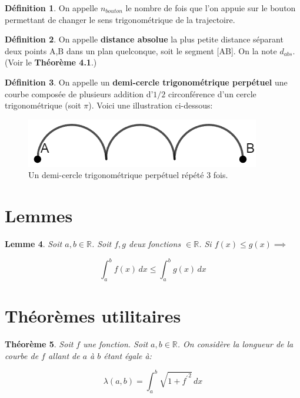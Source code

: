 \documentclass{amsart}
\newtheorem{theorem}{Théorème}[section]
\newtheorem{lemma}[theorem]{Lemme}
\theoremstyle{definition}
\newtheorem{definition}[theorem]{Définition}
\theoremstyle{remark}
\numberwithin{equation}{section}
\begin{document}
\begin{definition}
  On appelle $n_{bouton}$ le nombre de fois que l'on appuie sur le bouton permettant de changer le sens trigonométrique de la trajectoire.
\end{definition}

\begin{definition}
  On appelle \textbf{distance absolue} la plus petite distance séparant deux points A,B dans un plan quelconque, soit le segment [AB]. On la note $d_{abs}$. (Voir le \textbf{Théorème 4.1}.)
\end{definition}

\begin{definition}
  On appelle un \textbf{demi-cercle trigonométrique perpétuel} une courbe composée de plusieurs addition d'$1/2$ circonférence d'un cercle trigonométrique (soit $\pi$). Voici une illustration ci-dessous:

  \begin{figure}[!h]
    \centering
    \includegraphics[scale=0.5]{demicircle.png}
    \caption{Un demi-cercle trigonométrique perpétuel répété 3 fois.}
  \end{figure}
\end{definition}

\section{Lemmes}

\begin{lemma}
  Soit $a,b\in\mathbb{R}$. Soit $f,g$ deux fonctions $\in\mathbb{R}$. Si $f(x)\le g(x) \implies$

  \[\int_{a}^{b}f(x) \,dx \le \int_{a}^{b}g(x) \,dx\]
\end{lemma}

\section{Théorèmes utilitaires}

\begin{theorem}
  Soit $f$ une fonction. Soit $a,b\in\mathbb{R}$. On considère la longueur de la courbe de $f$ allant de $a$ à $b$ étant égale à:
  
  \[\lambda(a,b)=\int_{a}^{b} \sqrt{1+{f^\prime}^2} \,dx\]
\end{theorem}
\end{document}
